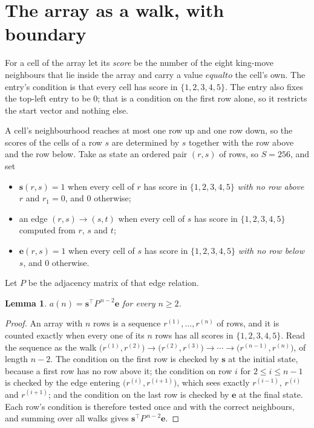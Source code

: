 \documentclass[11pt,a4paper]{article}
\theoremstyle{plain}
\newtheorem{lemma}[theorem]{Lemma}
\theoremstyle{definition}
\begin{document}
\section{The array as a walk, with boundary}

For a cell of the array let its \emph{score} be the number of the eight king-move neighbours that lie inside
the array and carry a value $equal to$ the cell's own. The entry's condition is that every cell
has score in $\{1,2,3,4,5\}$. The entry also fixes the top-left entry to be $0$; that is a condition on the first row alone, so it restricts the start vector and nothing else.

A cell's neighbourhood reaches at most one row up and one row down, so the scores of the
cells of a row $s$ are determined by $s$ together with the row above and the row below.
Take as state an ordered pair $(r,s)$ of rows, so $S=256$, and set
\begin{itemize}
\item $\mathbf{s}(r,s)=1$ when every cell of $r$ has score in $\{1,2,3,4,5\}$ \emph{with no row
above $r$} and $r_1=0$, and $0$ otherwise;
\item an edge $(r,s)\to(s,t)$ when every cell of $s$ has score in $\{1,2,3,4,5\}$ computed from
$r$, $s$ and $t$;
\item $\mathbf{e}(r,s)=1$ when every cell of $s$ has score in $\{1,2,3,4,5\}$ \emph{with no row
below $s$}, and $0$ otherwise.
\end{itemize}
Let $P$ be the adjacency matrix of that edge relation.

\begin{lemma}\label{lem:walk}
$a(n)=\mathbf{s}^{\!\top}P^{\,n-2}\mathbf{e}$ for every $n\ge2$.
\end{lemma}

\begin{proof}
An array with $n$ rows is a sequence $r^{(1)},\dots,r^{(n)}$ of rows, and it is counted
exactly when every one of its $n$ rows has all scores in $\{1,2,3,4,5\}$. Read the sequence as the
walk $\bigl(r^{(1)},r^{(2)}\bigr)\to\bigl(r^{(2)},r^{(3)}\bigr)\to\cdots\to
\bigl(r^{(n-1)},r^{(n)}\bigr)$, of length $n-2$. The condition on the first row is
checked by $\mathbf{s}$ at the initial state, because a first row has no row above it; the
condition on row $i$ for $2\le i\le n-1$ is checked by the edge entering
$\bigl(r^{(i)},r^{(i+1)}\bigr)$, which sees exactly $r^{(i-1)}$, $r^{(i)}$ and
$r^{(i+1)}$; and the condition on the last row is checked by $\mathbf{e}$ at the final
state. Each row's condition is therefore tested once and with the correct neighbours, and
summing over all walks gives $\mathbf{s}^{\!\top}P^{\,n-2}\mathbf{e}$.
\end{proof}
\end{document}

